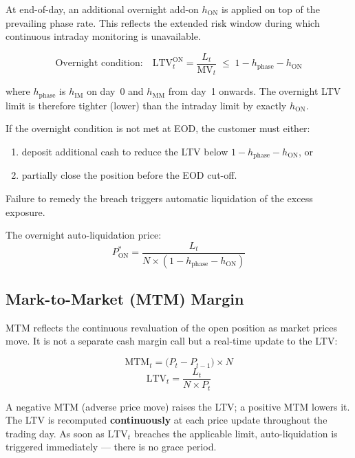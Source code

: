 \documentclass[9pt, a4paper]{extarticle}
\newenvironment{formulabox}{\par\addvspace{4pt}}{\par\addvspace{4pt}}
\begin{document}
At end-of-day, an additional overnight add-on $h_{\mathrm{ON}}$ is applied on top of
the prevailing phase rate. This reflects the extended risk window during which
continuous intraday monitoring is unavailable.

\begin{formulabox}
\[
    \text{Overnight condition:} \quad \mathrm{LTV}^{\mathrm{ON}}_t = \frac{L_t}{\mathrm{MV}_t}
    \;\leq\; 1 - h_{\mathrm{phase}} - h_{\mathrm{ON}}
\]
\end{formulabox}

where $h_{\mathrm{phase}}$ is $h_{\mathrm{IM}}$ on day~0 and $h_{\mathrm{MM}}$ from
day~1 onwards. The overnight LTV limit is therefore tighter (lower) than the intraday
limit by exactly $h_{\mathrm{ON}}$.

If the overnight condition is not met at EOD, the customer must either:
\begin{enumerate}[leftmargin=2em]
    \item deposit additional cash to reduce the LTV below $1 - h_{\mathrm{phase}} - h_{\mathrm{ON}}$, or
    \item partially close the position before the EOD cut-off.
\end{enumerate}
Failure to remedy the breach triggers automatic liquidation of the excess exposure.

The overnight auto-liquidation price:
\[
    P^{*}_{\mathrm{ON}} = \frac{L_t}{N \times (1 - h_{\mathrm{phase}} - h_{\mathrm{ON}})}
\]

\subsection{Mark-to-Market (MTM) Margin}

MTM reflects the continuous revaluation of the open position as market prices move.
It is not a separate cash margin call but a real-time update to the LTV:

\begin{formulabox}
\[
    \mathrm{MTM}_t = \bigl(P_t - P_{t-1}\bigr) \times N
\]
\[
    \mathrm{LTV}_t = \frac{L_t}{N \times P_t}
\]
\end{formulabox}

A negative MTM (adverse price move) raises the LTV; a positive MTM lowers it. The
LTV is recomputed \textbf{continuously} at each price update throughout the trading
day. As soon as $\mathrm{LTV}_t$ breaches the applicable limit, auto-liquidation is
triggered immediately — there is no grace period.
\end{document}
